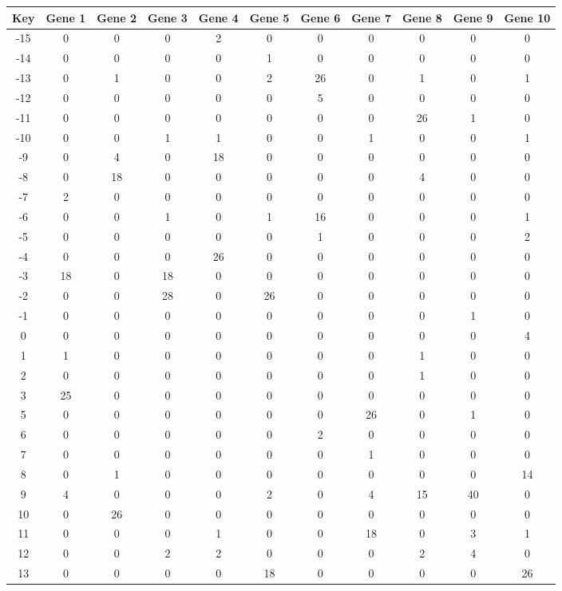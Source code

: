 \begin{tabular}{|c|c|c|c|c|c|c|c|c|c|c|}
\hline
Key & Gene 1 & Gene 2 & Gene 3 & Gene 4 & Gene 5 & Gene 6 & Gene 7 & Gene 8 & Gene 9 & Gene 10 \\
\hline
-15 & 0 & 0 & 0 & 2 & 0 & 0 & 0 & 0 & 0 & 0 \\
-14 & 0 & 0 & 0 & 0 & 1 & 0 & 0 & 0 & 0 & 0 \\
-13 & 0 & 1 & 0 & 0 & 2 & 26 & 0 & 1 & 0 & 1 \\
-12 & 0 & 0 & 0 & 0 & 0 & 5 & 0 & 0 & 0 & 0 \\
-11 & 0 & 0 & 0 & 0 & 0 & 0 & 0 & 26 & 1 & 0 \\
-10 & 0 & 0 & 1 & 1 & 0 & 0 & 1 & 0 & 0 & 1 \\
-9 & 0 & 4 & 0 & 18 & 0 & 0 & 0 & 0 & 0 & 0 \\
-8 & 0 & 18 & 0 & 0 & 0 & 0 & 0 & 4 & 0 & 0 \\
-7 & 2 & 0 & 0 & 0 & 0 & 0 & 0 & 0 & 0 & 0 \\
-6 & 0 & 0 & 1 & 0 & 1 & 16 & 0 & 0 & 0 & 1 \\
-5 & 0 & 0 & 0 & 0 & 0 & 1 & 0 & 0 & 0 & 2 \\
-4 & 0 & 0 & 0 & 26 & 0 & 0 & 0 & 0 & 0 & 0 \\
-3 & 18 & 0 & 18 & 0 & 0 & 0 & 0 & 0 & 0 & 0 \\
-2 & 0 & 0 & 28 & 0 & 26 & 0 & 0 & 0 & 0 & 0 \\
-1 & 0 & 0 & 0 & 0 & 0 & 0 & 0 & 0 & 1 & 0 \\
0 & 0 & 0 & 0 & 0 & 0 & 0 & 0 & 0 & 0 & 4 \\
1 & 1 & 0 & 0 & 0 & 0 & 0 & 0 & 1 & 0 & 0 \\
2 & 0 & 0 & 0 & 0 & 0 & 0 & 0 & 1 & 0 & 0 \\
3 & 25 & 0 & 0 & 0 & 0 & 0 & 0 & 0 & 0 & 0 \\
5 & 0 & 0 & 0 & 0 & 0 & 0 & 26 & 0 & 1 & 0 \\
6 & 0 & 0 & 0 & 0 & 0 & 2 & 0 & 0 & 0 & 0 \\
7 & 0 & 0 & 0 & 0 & 0 & 0 & 1 & 0 & 0 & 0 \\
8 & 0 & 1 & 0 & 0 & 0 & 0 & 0 & 0 & 0 & 14 \\
9 & 4 & 0 & 0 & 0 & 2 & 0 & 4 & 15 & 40 & 0 \\
10 & 0 & 26 & 0 & 0 & 0 & 0 & 0 & 0 & 0 & 0 \\
11 & 0 & 0 & 0 & 1 & 0 & 0 & 18 & 0 & 3 & 1 \\
12 & 0 & 0 & 2 & 2 & 0 & 0 & 0 & 2 & 4 & 0 \\
13 & 0 & 0 & 0 & 0 & 18 & 0 & 0 & 0 & 0 & 26 \\
\hline
\end{tabular}
